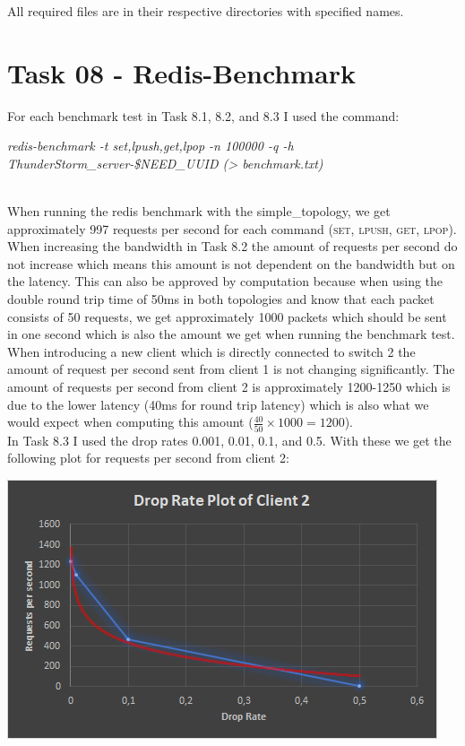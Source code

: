 \documentclass{article}
\begin{document}
	\pagestyle{fancy}
	
	All required files are in their respective directories with specified names.	
	
	\section*{Task 08 - Redis-Benchmark}
	\begin{adjustwidth}{2em}{2em}
		For each benchmark test in Task 8.1, 8.2, and 8.3 I used the command: \\
		\begin{adjustwidth}{-2em}{-2em}
		\small{\emph{\textit{redis-benchmark -t set,lpush,get,lpop -n 100000 -q -h ThunderStorm\_server-\$NEED\_UUID (> benchmark.txt)}}}
		\end{adjustwidth}
		\hfill \\
		When running the redis benchmark with the simple\_topology, we get approximately 997 requests per second for each command (\textsc{set, lpush, get, lpop}). When increasing the bandwidth in Task 8.2 the amount of requests per second do not increase which means this amount is not dependent on the bandwidth but on the latency. This can also be approved by computation because when using the double round trip time of 50ms in both topologies and know that each packet consists of 50 requests, we get approximately 1000 packets which should be sent in one second which is also the amount we get when running the benchmark test. \\
		When introducing a new client which is directly connected to switch 2 the amount of request per second sent from client 1 is not changing significantly. The amount of requests per second from client 2 is approximately 1200-1250 which is due to the lower latency (40ms for round trip latency) which is also what we would expect when computing this amount ($\frac{40}{50} \times 1000 = 1200$). \\
		In Task 8.3 I used the drop rates 0.001, 0.01, 0.1, and 0.5. With these we get the following plot for requests per second from  client 2: \\
		\begin{center}
			\includegraphics[scale=0.7]{drop_rate.png}

\end{center}
\end{adjustwidth}
\end{document}
